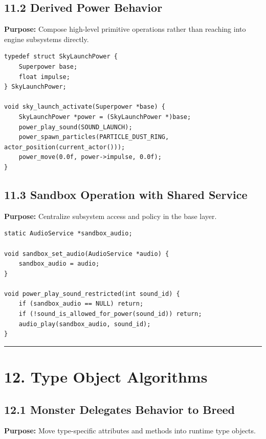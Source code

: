 \documentclass[10pt,letterpaper]{article}
\begin{document}
\subsection{11.2 Derived Power Behavior}

\textbf{Purpose:} Compose high-level primitive operations rather than reaching into engine subsystems directly.

\begin{verbatim}
typedef struct SkyLaunchPower {
    Superpower base;
    float impulse;
} SkyLaunchPower;

void sky_launch_activate(Superpower *base) {
    SkyLaunchPower *power = (SkyLaunchPower *)base;
    power_play_sound(SOUND_LAUNCH);
    power_spawn_particles(PARTICLE_DUST_RING, actor_position(current_actor()));
    power_move(0.0f, power->impulse, 0.0f);
}
\end{verbatim}

\subsection{11.3 Sandbox Operation with Shared Service}

\textbf{Purpose:} Centralize subsystem access and policy in the base layer.

\begin{verbatim}
static AudioService *sandbox_audio;

void sandbox_set_audio(AudioService *audio) {
    sandbox_audio = audio;
}

void power_play_sound_restricted(int sound_id) {
    if (sandbox_audio == NULL) return;
    if (!sound_is_allowed_for_power(sound_id)) return;
    audio_play(sandbox_audio, sound_id);
}
\end{verbatim}

\medskip\hrule\medskip

\clearpage
\section{12. Type Object Algorithms}

\subsection{12.1 Monster Delegates Behavior to Breed}

\textbf{Purpose:} Move type-specific attributes and methods into runtime type objects.
\end{document}
